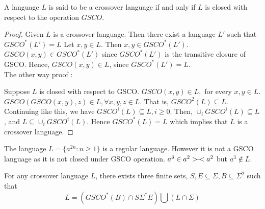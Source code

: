 \documentclass{llncs}
\newcommand{\ers}{>\hspace{-2mm}-\hspace{-2mm}<}
\begin{document}
\begin{theorem}
A language $L$ is said to be a crossover language if and only if $L$
is closed with respect to the operation $GSCO$.
\end{theorem}
\begin{proof}
Given $L$ is a crossover language. Then there exist a language $L'$
such that $GSCO^*(L') = L$  Let $x,y \in L$. Then $x,y \in
GSCO^*(L')$. $GSCO(x,y)  \in  GSCO^*(L')$ since $GSCO^*(L')$
 is the transitive closure of GSCO.   Hence, $GSCO(x,y) \in L$, since
 $GSCO^*(L') = L$.\\

 \noindent The other way proof :\\

 \par Suppose $L$ is closed with respect to GSCO. $GSCO(x,y) \in
 L,  $ for every $ x,y \in L$.  $GSCO(GSCO(x,y),z) \in L, \forall x,y,z \in
  L$. That is, $GSCO^2(L) \subseteq L$.  Continuing like this, we have
 $GSCO^i(L) \subseteq L, i \geq 0$. Then, $\cup_{i}GSCO^i(L) \subseteq L$,
 and
   $L \subseteq \cup_{i}GSCO^i(L)$. Hence $GSCO^*(L) = L$ which implies
 that $L$ is a crossover language.
\end{proof}
\begin{example}\label{not}
The language $L=\{a^{2n}:n\geq1\}$ is a regular language. However it
is not a GSCO language as it is not closed under GSCO operation.
$a^3\in a^2\ers a^2$ but $a^3\notin L$.
\end{example}
\begin{theorem}
For any crossover language $L$, there exists  three finite sets,
$S,E
 \subseteq \Sigma  , B \subseteq \Sigma^2$ such that
\[L = (GSCO^*(B)  \cap S \Sigma^* E)  \bigcup  (L \cap \Sigma) \]
\end{theorem}
\end{document}
